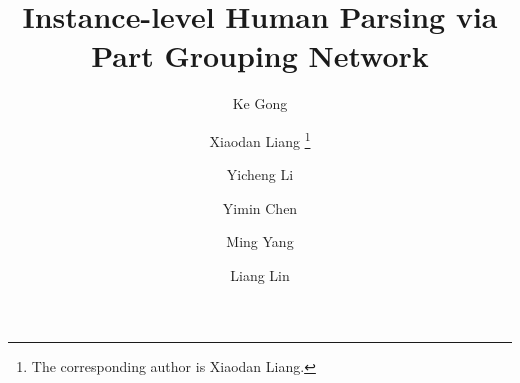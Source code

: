 \documentclass[runningheads]{llncs}
\begin{document}
%
\title{Instance-level Human Parsing via Part Grouping Network} 

%
\author{Ke Gong \and
Xiaodan Liang \thanks{The corresponding author is Xiaodan Liang.}\and
Yicheng Li \and
Yimin Chen \and
Ming Yang \and
Liang Lin}
%
%
\end{document}
